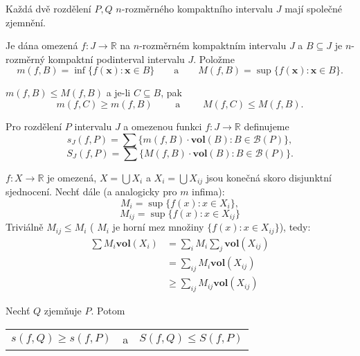 \documentclass[../main.tex]{subfiles}
\begin{document}
\begin{observation}
	Každá dvě rozdělení $P,Q$ $n$-rozměrného kompaktního intervalu $J$ mají společné zjemnění.
\end{observation}

\begin{definition}
	Je dána omezená $f: J \rightarrow \mathbb{R}$ na $n$-rozměrném kompaktním intervalu $J$ a $B \subseteq J$ je 
	$n$-rozměrný kompaktní podinterval intervalu $J$. Položme
	\[m(f,B) = \inf\{f(\textbf{x}) : \textbf{x} \in B\} \qquad \text{a} \qquad M(f,B) = \sup\{f(\textbf{x}) : \textbf{x} \in B\}.\]
\end{definition}

\begin{observation}
	$m(f,B) \leq M(f,B)$ a je-li $C \subseteq B$, pak 
	\[m(f,C) \geq m(f,B) \qquad \text{ a } \qquad M(f,C) \leq M(f,B).\]
\end{observation}

\begin{definition}
	Pro rozdělení $P$ intervalu $J$ a omezenou funkci $f : J \rightarrow \mathbb{R}$ definujeme 
	\[s_J(f,P) = \sum \{m(f,B) \cdot \textbf{vol}(B) : B \in \mathcal{B}(P)\},\]
	\[S_J(f,P) = \sum \{M(f,B) \cdot \textbf{vol}(B) : B \in \mathcal{B}(P)\}.\]
\end{definition}

\begin{observation}[obecné]
	$f: X \rightarrow \mathbb{R}$ je omezená, $X = \bigcup X_i$ a $X_i = \bigcup X_{ij}$ jsou konečná skoro disjunktní sjednocení. Nechť dále (a analogicky pro $m$ infima):
	\[M_i = \sup\{f(x) : x \in X_i\},\]
	\[M_{ij} = \sup\{f(x) : x \in X_{ij}\}\]
	Triviálně $M_{ij} \leq M_i$ ( $M_i$ je horní mez množiny $\{f(x) : x \in X_{ij}\}$), tedy:
	$$
	\begin{aligned}
		\sum M_i \textbf{vol}(X_i) &= \sum_i M_i \sum_j \textbf{vol}(X_{ij}) \\
	  &= \sum_{ij}M_i \textbf{vol}(X_{ij}) \\
		&\geq \sum_{ij} M_{ij} \textbf{vol}(X_{ij})
	\end{aligned}
	$$
\end{observation}

\begin{lemma}
	Nechť $Q$ zjemňuje $P$. Potom
	\begin{center}
	    \begin{tabular}{c c c}
	        $s(f,Q) \geq s(f,P)$ & a & $S(f,Q) \leq S(f,P)$
	    \end{tabular}
	\end{center}
\end{lemma}
\end{document}
